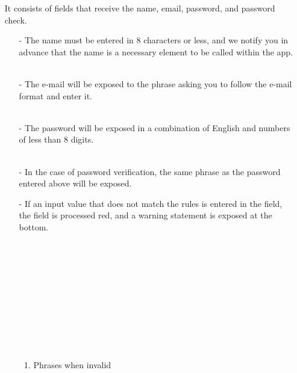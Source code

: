 \documentclass[conference]{IEEEtran}
\begin{document}
\begin{enumerate}
    \item[] It consists of fields that receive the name, email, password, and password check.
    \begin{itemize}
    \item[-] The name must be entered in 8 characters or less, and we notify you in advance that the name is a necessary element to be called within the app. \\ \\
    \item[-] The e-mail will be exposed to the phrase asking you to follow the e-mail format and enter it.
    \\ \\
    \item[-] The password will be exposed in a combination of English and numbers of less than 8 digits.
    \\ \\
    \item[-] In the case of password verification, the same phrase as the password entered above will be exposed.
    \\
    \item[-] If an input value that does not match the rules is entered in the field, the field is processed red, and a warning statement is exposed at the bottom.
    \\ \\ \\ \\ \\ \\ \\ \\ \\ \\ \\
          \begin{enumerate} 
          \item Phrases when invalid \\ \\ \\

\end{enumerate}
\end{itemize}
\end{enumerate}
\end{document}

